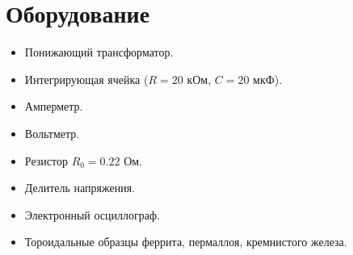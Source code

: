 \section*{Оборудование}

\begin{itemize}[itemsep = 0pt, parsep=0pt]
	
	\item Понижающий трансформатор.
	
	\item Интегрирующая ячейка ($R = 20$ кОм, $C = 20$ мкФ).
	
	\item Амперметр.
	
	\item Вольтметр.
	
	\item Резистор $R_0 = 0.22$ Ом.
	
	\item Делитель напряжения.
	
	\item Электронный осциллограф.
	
	\item Тороидальные образцы феррита, пермаллоя, кремнистого железа.
\end{itemize}